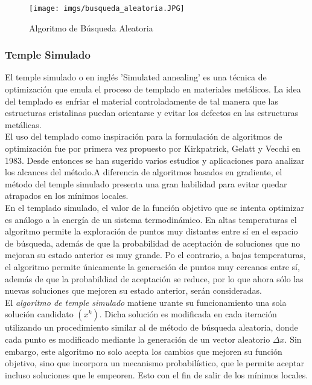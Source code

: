 \documentclass{article}
\begin{document}
\begin{figure}[h!]
    \centering
    \texttt{[image: imgs/busqueda\_aleatoria.JPG]}
    \caption{Algoritmo de B\'usqueda Aleatoria}
    \label{fig:my_label}
\end{figure}

\subsubsection{Temple Simulado}
El temple simulado o en ingl\'es 'Simulated annealing' es una t\'ecnica de optimizaci\'on que emula el proceso de templado en materiales met\'alicos. La idea del templado es enfriar el material controladamente de tal manera que las estructuras cristalinas puedan orientarse y evitar los defectos en las estructuras met\'alicas. \\ El uso del templado como inspiraci\'on para la formulaci\'on de algoritmos de optimizaci\'on fue por primera vez propuesto por Kirkpatrick, Gelatt y Vecchi en 1983. Desde entonces se han sugerido varios estudios y aplicaciones para analizar los alcances del m\'etodo.A diferencia de algoritmos basados en gradiente, el m\'etodo del temple simulado presenta una gran habilidad para evitar quedar atrapados en los m\'inimos locales.\\En el templado simulado, el valor de la función objetivo que se intenta optimizar es análogo a la energía de un sistema termodinámico. En altas temperaturas el algoritmo permite la exploración de puntos muy distantes entre sí en el espacio de búsqueda, además de que la probabilidad de aceptación de soluciones que no mejoran su estado anterior es muy grande. Po el contrario, a bajas temperaturas, el algoritmo permite \'unicamente la generaci\'on de puntos muy cercanos entre s\'i, adem\'as de que la probabildiad de aceptaci\'on se reduce, por lo que ahora s\'olo las nuevas soluciones que mejoren su estado anterior, ser\'an consideradas.\\El \textit{algoritmo de temple simulado} matiene urante su funcionamiento una sola soluci\'on candidato $(x^k)$. Dicha soluci\'on es modificada en cada iteraci\'on utilizando un procedimiento similar al de m\'etodo de b\'usqueda aleatoria, donde cada punto es modificado mediante la generaci\'on de un vector aleatorio $\Delta x$. Sin embargo, este algoritmo no solo acepta los cambios que mejoren su funci\'on objetivo, sino que incorpora un mecanismo probabil\'istico, que le permite aceptar incluso soluciones que le empeoren. Esto con el fin de salir de los m\'inimos locales.
\end{document}

